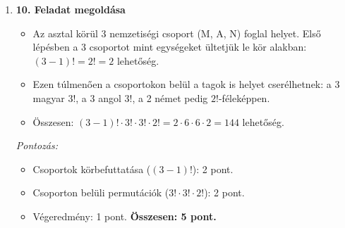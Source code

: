 \documentclass[12pt,a4paper]{article}
\begin{document}
\begin{enumerate}
    \item \textbf{10. Feladat megoldása}
    \begin{itemize}
        \item Az asztal körül 3 nemzetiségi csoport (M, A, N) foglal helyet. Első lépésben a 3 csoportot mint egységeket ültetjük le kör alakban: $(3-1)! = 2! = 2$ lehetőség.
        \item Ezen túlmenően a csoportokon belül a tagok is helyet cserélhetnek: a 3 magyar $3!$, a 3 angol $3!$, a 2 német pedig $2!$-féleképpen.
        \item Összesen: $(3-1)! \cdot 3! \cdot 3! \cdot 2! = 2 \cdot 6 \cdot 6 \cdot 2 = 144$ lehetőség.
    \end{itemize}
    \emph{Pontozás:}
    \begin{itemize}
        \item Csoportok körbefuttatása ($(3-1)!$): 2 pont.
        \item Csoporton belüli permutációk ($3! \cdot 3! \cdot 2!$): 2 pont.
        \item Végeredmény: 1 pont.
        \textbf{Összesen: 5 pont.}
    \end{itemize}

\end{enumerate}
\end{document}

